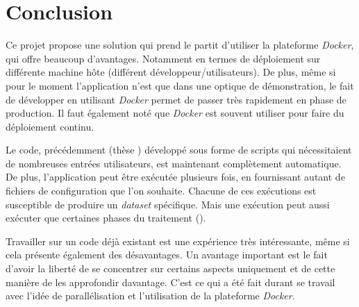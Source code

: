 \chapter{Conclusion}
\label{ch:conclusion}

Ce projet propose une solution qui prend le partit d'utiliser la plateforme \emph{Docker}, qui offre beaucoup d'avantages. Notamment en termes de déploiement sur différente machine hôte (différent développeur/utilisateurs). De plus, même si pour le moment l'application n'est que dans une optique de démonstration, le fait de développer en utilisant \emph{Docker} permet de passer très rapidement en phase de production. Il faut également noté que \emph{Docker} est souvent utiliser pour faire du déploiement continu.

Le code, précédemment (thèse \thLeite) développé sous forme de scripts qui nécessitaient de nombreuses entrées utilisateurs, est maintenant complètement automatique. De plus, l'application peut être exécutée plusieurs fois, en fournissant autant de fichiers de configuration que l'on souhaite. Chacune de ces exécutions est susceptible de produire un \emph{dataset} spécifique. Mais une exécution peut aussi exécuter que certaines phases du traitement (\thLeite).

Travailler sur un code déjà existant est une expérience très intéressante, même si cela présente également des désavantages. Un avantage important est le fait d'avoir la liberté de se concentrer sur certains aspects uniquement et de cette manière de les approfondir davantage. C'est ce qui a été fait durant se travail avec l'idée de parallélisation et l'utilisation de la plateforme \emph{Docker}.
